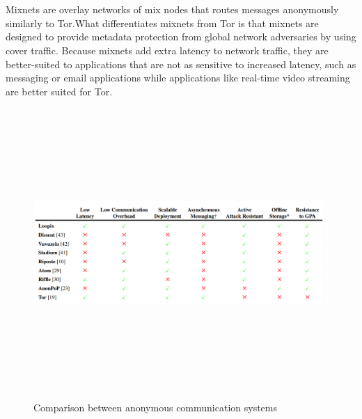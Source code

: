 \\~\\Mixnets are overlay networks of mix nodes that routes messages anonymously similarly to Tor.What differentiates mixnets from Tor is that mixnets are designed to provide metadata protection from global network adversaries by using cover traffic. Because mixnets add extra latency to network traffic, they are better-suited to applications that are not as sensitive to increased latency, such as messaging or email applications while applications like real-time video streaming are better suited for Tor. 
\begin{figure}[H]
    \centering
    \includegraphics[width=11cm,height=11cm,keepaspectratio]{../whitepaper/images/state-of-the-art.png}
    \caption{Comparison between anonymous communication systems}
    \label{fig:Comparison between anonymous communication systems}
\end{figure}




